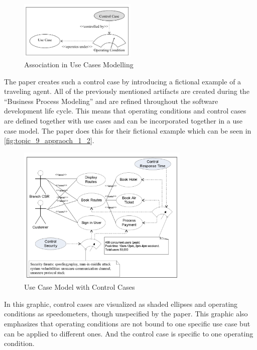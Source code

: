 \begin{figure}[htbp]
	\centering
	\includegraphics[width=0.5\textwidth]{../images/topic_9_approach_1_1.png}
	\caption{Association in Use Cases Modelling~\cite{ZouPavlovski2008}}
	\label{fig:topic_9_appraoch_1_use_case}
\end{figure}

The paper creates such a control case by introducing a fictional example of a traveling agent.
All of the previously mentioned artifacts are created during the \enquote{Business Process Modeling} and are refined throughout the software development life cycle.
This means that operating conditions and control cases are defined together with use cases and can be incorporated together in a use case model.
The paper does this for their fictional example which can be seen in \autoref{fig:topic_9_appraoch_1_2}. 

\begin{figure}[h!]
	\centering
	\includegraphics[width=0.73\textwidth]{../images/topic_9_approach_1_2.png}
	\caption{Use Case Model with Control Cases~\cite{ZouPavlovski2008}}
	\label{fig:topic_9_appraoch_1_2}
\end{figure}

In this graphic, control cases are visualized as shaded ellipses and operating conditions as speedometers, though unspecified by the paper. 
This graphic also emphasizes that operating conditions are not bound to one specific use case but can be applied to different ones.
And the control case is specific to one operating condition.


